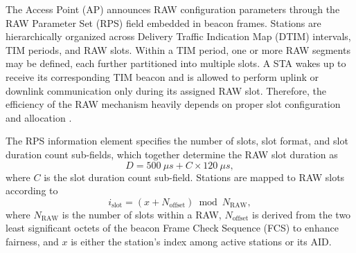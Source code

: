 \documentclass[journal]{IEEEtran}
\begin{document}
The Access Point (AP) announces RAW configuration parameters through the RAW Parameter Set (RPS) field embedded in beacon frames. Stations are hierarchically organized across Delivery Traffic Indication Map (DTIM) intervals, TIM periods, and RAW slots. Within a TIM period, one or more RAW segments may be defined, each further partitioned into multiple slots. A STA wakes up to receive its corresponding TIM beacon and is allowed to perform uplink or downlink communication only during its assigned RAW slot. Therefore, the efficiency of the RAW mechanism heavily depends on proper slot configuration and allocation \cite{IEEE80211ah2016, TIAN2021103036}.


The RPS information element specifies the number of slots, slot format, and slot duration count sub-fields, which together determine the RAW slot duration as
\begin{equation}
D = 500~\mu s + C \times 120~\mu s,
\end{equation}
where $C$ is the slot duration count sub-field. %
Stations are mapped to RAW slots according to
\begin{equation}
i_{\text{slot}} = (x + N_{\text{offset}}) \bmod N_{\text{RAW}},
\end{equation}
where $N_{\text{RAW}}$ is the number of slots within a RAW, $N_{\text{offset}}$ is derived from the two least significant octets of the beacon Frame Check Sequence (FCS) to enhance fairness, and $x$ is either the station's index among active stations or its AID.
\end{document}
